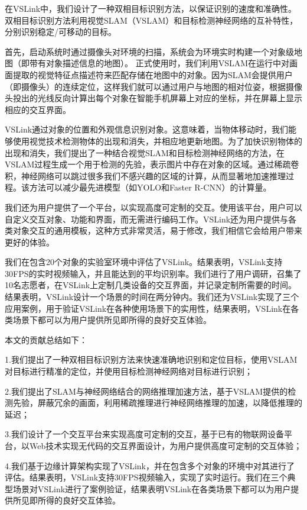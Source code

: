 在VSLink中，我们设计了一种双相目标识别方法，以保证识别的速度和准确性。双相目标识别方法利用视觉SLAM（VSLAM）和目标检测神经网络的互补特性，分别识别稳定/可移动的目标。

首先，启动系统时通过摄像头对环境的扫描，系统会为环境实时构建一个对象级地图（即带有对象描述信息的地图）。
正式使用时，我们利用VSLAM在运行中对画面提取的视觉特征点描述符来匹配存储在地图中的对象。因为SLAM会提供用户（即摄像头）的连续定位，这样我们就可以通过用户与地图的相对位姿，根据摄像头投出的光线反向计算出每个对象在智能手机屏幕上对应的坐标，并在屏幕上显示相应的交互界面。

VSLink通过对象的位置和外观信息识别对象。这意味着，当物体移动时，我们能够使用视觉技术检测物体的出现和消失，并相应地更新地图。为了加快识别物体的出现和消失，我们提出了一种结合视觉SLAM和目标检测神经网络的方法，在VSLAM过程生成一个用于检测的先验，表示图片中存在对象的区域。通过稀疏卷积\cite{ren2018sbnet}，神经网络可以跳过很多我们不感兴趣的区域的计算，从而显著地加速推理过程。该方法可以减少最先进模型（如YOLO和Faster R-CNN）的计算量。

我们还为用户提供了一个平台，以实现高度可定制的交互。使用该平台，用户可以自定义交互对象、功能和界面，而无需进行编码工作。VSLink还为用户提供与各类对象交互的通用模板，这种方式非常灵活，易于修改，我们相信它会给用户带来更好的体验。

我们在包含20个对象的实验室环境中评估了VSLink。结果表明，VSLink支持30FPS的实时视频输入，并且能达到{\acc}的平均识别率。我们进行了用户调研，召集了10名志愿者，在VSLink上定制几类设备的交互界面，并记录定制所需要的时间。结果表明，VSLink设计一个场景的时间在两分钟内。我们还为VSLink实现了三个应用案例，用于验证VSLink在各种使用场景下的实用性，结果表明，VSLink在各类场景下都可以为用户提供所见即所得的良好交互体验。

本文的贡献总结如下：

1.我们提出了一种双相目标识别方法来快速准确地识别和定位目标，使用VSLAM对目标进行精准的定位，并使用目标检测神经网络对目标进行识别；

2.我们提出了SLAM与神经网络结合的网络推理加速方法，基于VSLAM提供的检测先验，屏蔽冗余的画面，利用稀疏推理进行神经网络推理的加速，以降低推理的延迟；

3.我们设计了一个交互平台来实现高度可定制的交互，基于已有的物联网设备平台，以Web技术实现无代码的交互界面设计，为用户提供高度可定制的交互体验；

4.我们基于边缘计算架构实现了VSLink，并在包含多个对象的环境中对其进行了评估。结果表明，VSLink支持30FPS视频输入，实现了实时运行。我们在三个典型场景对VSLink进行了案例验证，结果表明VSLink在各类场景下都可以为用户提供所见即所得的良好交互体验。

